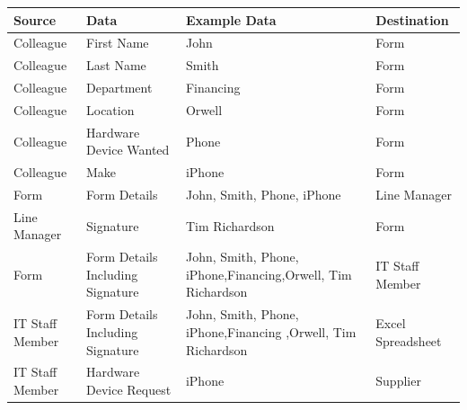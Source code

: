\begin{center}
\begin{tabular}{|p{3cm}|p{3cm}|p{4cm}|p{3cm}|}
\hline
\textbf{Source} & \textbf{Data} & \textbf{Example Data}      & \textbf{Destination} \\ \hline
Colleague                             & First Name                         & John                                               & Form                                      \\ \hline
Colleague                             & Last Name                          & Smith                                              & Form                                      \\ \hline
Colleague                             & Department                              & Financing                                            & Form                                      \\ \hline
Colleague                             & Location                              & Orwell                                            & Form                                      \\ \hline
Colleague                             & Hardware Device Wanted             & Phone                                              & Form                                      \\ \hline
Colleague                             & Make                               & iPhone                                             & Form                                      \\ \hline
Form                                  & Form Details                       & John, Smith, Phone, iPhone                 & Line Manager                              \\ \hline
Line Manager                          & Signature                          & Tim Richardson                                     & Form                                      \\ \hline
Form                                  & Form Details Including Signature   & John, Smith, Phone, iPhone,Financing,Orwell, Tim Richardson & IT Staff Member                           \\ \hline
IT Staff Member                      & Form Details Including Signature   & John, Smith, Phone, iPhone,Financing ,Orwell, Tim Richardson & Excel Spreadsheet                                   \\ \hline
IT Staff Member 	&Hardware Device Request & iPhone & Supplier 												\\ \hline

\end{tabular}
\end{center}
